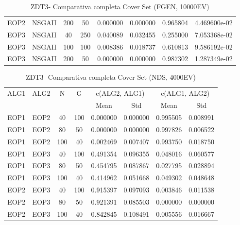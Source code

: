 \begin{table}[H]
\begin{tabular}{cccccccc}
 EOP2 &  NSGAII &  200 &   50 &            0.000000 &           0.000000 &            0.965804 &       4.469600e-02 \\
 EOP3 &  NSGAII &   40 &  250 &            0.040089 &           0.032455 &            0.255000 &       7.053368e-02 \\
 EOP3 &  NSGAII &  100 &  100 &            0.008386 &           0.018737 &            0.610813 &       9.586192e-02 \\
 EOP3 &  NSGAII &  200 &   50 &            0.000000 &           0.000000 &            0.987302 &       1.287349e-02 \\
\bottomrule
\end{tabular}
\caption{ZDT3- Comparativa completa Cover Set (FGEN, 10000EV)}
\label{table:6}
\end{table}

\begin{table}[H]
\centering
\renewcommand{\arraystretch}{1.5}
\begin{tabular}{cccccccc}
\toprule
 \multirow{2}{*}{ALG1} &    \multirow{2}{*}{ALG2} &    \multirow{2}{*}{N} &    \multirow{2}{*}{G} &  \multicolumn{2}{c}{c(ALG2, ALG1)} &  \multicolumn{2}{c}{c(ALG1, ALG2)} \\ \cline{5-6} \cline{7-8}
   &   &   &   &  Mean &  Std &  Mean &  Std \\
\midrule
 EOP1 &  EOP2 &   40 &  100 &            0.000000 &           0.000000 &            0.995505 &           0.008991 \\
 EOP1 &  EOP2 &   80 &   50 &            0.000000 &           0.000000 &            0.997826 &           0.006522 \\
 EOP1 &  EOP2 &  100 &   40 &            0.002469 &           0.007407 &            0.993750 &           0.018750 \\
 EOP1 &  EOP3 &   40 &  100 &            0.491354 &           0.096355 &            0.048016 &           0.060577 \\
 EOP1 &  EOP3 &   80 &   50 &            0.454795 &           0.087867 &            0.027795 &           0.028894 \\
 EOP1 &  EOP3 &  100 &   40 &            0.414962 &           0.051668 &            0.049302 &           0.048648 \\
 EOP2 &  EOP3 &   40 &  100 &            0.915397 &           0.097093 &            0.003846 &           0.011538 \\
 EOP2 &  EOP3 &   80 &   50 &            0.921391 &           0.085503 &            0.000000 &           0.000000 \\
 EOP2 &  EOP3 &  100 &   40 &            0.842845 &           0.108491 &            0.005556 &           0.016667 \\
\bottomrule
\end{tabular}
\caption{ZDT3- Comparativa completa Cover Set (NDS, 4000EV)}
\label{table:7}
\end{table}

